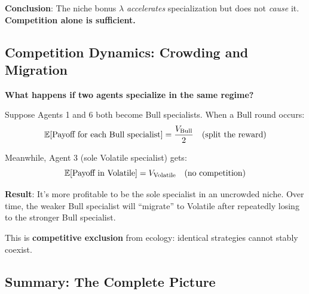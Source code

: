 \textbf{Conclusion}: The niche bonus $\lambda$ \textit{accelerates} specialization but does not \textit{cause} it. \textbf{Competition alone is sufficient.}


\subsection{Competition Dynamics: Crowding and Migration}

\textbf{What happens if two agents specialize in the same regime?}

Suppose Agents 1 and 6 both become Bull specialists. When a Bull round occurs:
\begin{equation}
\mathbb{E}[\text{Payoff for each Bull specialist}] = \frac{V_{\text{Bull}}}{2} \quad \text{(split the reward)}
\end{equation}

Meanwhile, Agent 3 (sole Volatile specialist) gets:
\begin{equation}
\mathbb{E}[\text{Payoff in Volatile}] = V_{\text{Volatile}} \quad \text{(no competition)}
\end{equation}

\textbf{Result}: It's more profitable to be the sole specialist in an uncrowded niche. Over time, the weaker Bull specialist will ``migrate'' to Volatile after repeatedly losing to the stronger Bull specialist.

This is \textbf{competitive exclusion} from ecology: identical strategies cannot stably coexist.


\subsection{Summary: The Complete Picture}

